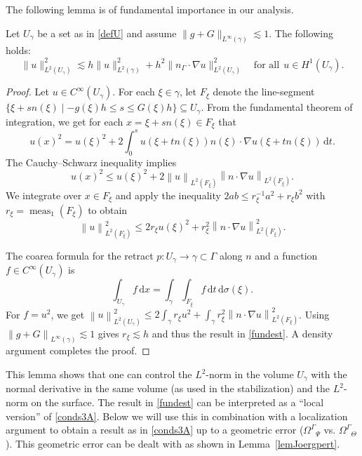 \documentclass[final]{siamltex}
\begin{document}
The following lemma is of fundamental importance in our analysis.
\begin{lemma}\label{lemJoerg-local}
Let $U_\gamma$ be a set as in \eqref{defU} and assume $\|g+G\|_{L^\infty(\gamma)} \lesssim 1$. The following holds:
\begin{equation} \label{fundest}
 \|u\|_{L^2(U_\gamma)}^2 \lesssim h \|u\|_{L^2(\gamma)}^2 + h^2 \|n_\Gamma\cdot \nabla u\|_{L^2(U_\gamma)}^2 \quad \text{for all} ~~u \in H^1(U_\gamma).
\end{equation}
\end{lemma}
\begin{proof}
Let $u\in C^\infty(U_\gamma)$. For each $\xi\in\gamma$, let $F_\xi$ denote the line-segment $\{\xi +s n(\xi)\mid -g(\xi)h\le s\le G(\xi)h\}\subseteq U_\gamma$. From the fundamental theorem of integration, we get for each $x= \xi+s n (\xi)\in F_\xi$ that
\[
  u(x)^2= u(\xi)^2 + 2\int_0^s u(\xi+tn(\xi))n(\xi)\cdot\nabla u(\xi+tn(\xi)) {\,\mathrm{d} t}.
\]
The Cauchy--Schwarz inequality implies
\[
  u(x)^2\le u(\xi)^2 + 2{\left\lVert {u} \right\rVert}_{L^2(F_\xi)}{\left\lVert {n\cdot\nabla u} \right\rVert}_{L^2(F_\xi)}.
\]
We integrate over $x\in F_\xi$ and apply the inequality $2ab\le r_\xi^{-1}a^2 + r_\xi b^2$ with $r_\xi = \operatorname{\operatorname{meas}}_1(F_\xi)$ to obtain
\[
  {\left\lVert {u} \right\rVert}_{L^2(F_\xi)}^2\le 2r_\xi u(\xi)^2 + r_\xi^2{\left\lVert {n\cdot\nabla u} \right\rVert}_{L^2(F_\xi)}^2.
\]

The coarea formula for the retract $p\colon U_\gamma\to \gamma \subset \Gamma$ along $n$ and a function $f\in C^\infty(U_\gamma)$ is
\[
  \int_{U_\gamma} f {\,\mathrm{d} x} = \int_\gamma \int_{F_\xi} f{\,\mathrm{d} t} {\,\mathrm{d} \sigma}(\xi).
\]
For $f\!=\!u^2$, we get ${\left\lVert {u} \right\rVert}_{L^2(U_\gamma)}^2 \!\le\! 2\int_\gamma r_\xi u^2 + \int_\gamma r_\xi^2 {\left\lVert {n\cdot\nabla u} \right\rVert}_{L^2(F_\xi)}^2$.\! Using ${\left\lVert {g+G} \right\rVert}_{L^\infty(\gamma)}\lesssim 1$ gives $r_\xi \lesssim h$ and thus the result in \eqref{fundest}. A density argument completes the proof.
\end{proof}

This lemma shows that one can control the $L^2$-norm in the volume $U_\gamma$ with the normal derivative in the same volume (as used in the stabilization) and the $L^2$-norm on the surface. The result in \eqref{fundest} can be interpreted as a ``local version'' of \eqref{conds3A}. Below we will use this in combination with a localization argument to obtain a result as in \eqref{conds3A} up to a geometric error (${\Omega^{\Gamma}}_\Psi$ vs. ${\Omega^{\Gamma}}_\Theta$). This geometric error can be dealt with as shown in Lemma~\ref{lemJoergpert}.
\end{document}
